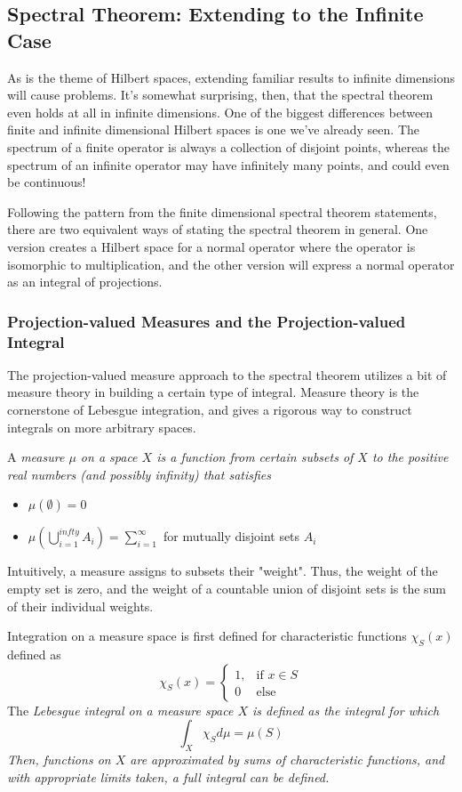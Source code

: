 \subsection{Spectral Theorem: Extending to the Infinite Case}

As is the theme of Hilbert spaces, extending familiar results to infinite
dimensions will cause problems. It's somewhat surprising, then, that the
spectral theorem even holds at all in infinite dimensions. One of the biggest
differences between finite and infinite dimensional Hilbert spaces is one we've
already seen. The spectrum of a finite operator is always a collection of
disjoint points, whereas the spectrum of an infinite operator may have
infinitely many points, and could even be continuous!

Following the pattern from the finite dimensional spectral theorem statements,
there are two equivalent ways of stating the spectral theorem in general. One
version creates a Hilbert space for a normal operator where the operator is
isomorphic to multiplication, and the other version will express a normal
operator as an integral of projections.

\subsubsection{Projection-valued Measures and the Projection-valued Integral}
The projection-valued measure approach to the spectral theorem utilizes a bit of
measure theory in building a certain type of integral. Measure theory is the
cornerstone of Lebesgue integration, and gives a rigorous way to construct
integrals on more arbitrary spaces.

A \em measure \em $\mu$ on a space $X$ is a function from certain subsets of $X$
to the positive real numbers (and possibly infinity) that satisfies
\begin{itemize}
    \itemsep0em
    \item $\mu(\emptyset) = 0$
    \item $\mu(\bigcup_{i=1}^{infty}A_i) = \sum_{i=1}^{\infty}$ for mutually
        disjoint sets $A_i$

\end{itemize}

Intuitively, a measure assigns to subsets their "weight". Thus, the weight of
the empty set is zero, and the weight of a countable union of disjoint sets is
the sum of their individual weights.

Integration on a measure space is first defined for characteristic functions
$\chi_S(x)$ defined as
\[
    \chi_S(x) =
    \begin{cases}
        1, &\text{if }x\in S\\
        0 &\text{else}
    \end{cases}
    \]
The \em Lebesgue integral \em on a measure space $X$ is defined as the integral
for which
\[
    \int_X \chi_S d\mu = \mu(S)
\]
Then, functions on $X$ are approximated by sums of characteristic functions, and
with appropriate limits taken, a full integral can be defined.


